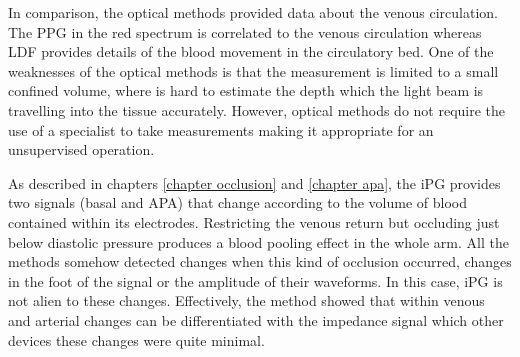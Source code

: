 In comparison, the optical methods provided data about the venous circulation. The PPG in the red spectrum is correlated to the venous circulation whereas LDF provides details of the blood movement in the circulatory bed. One of the weaknesses of the optical methods is that the measurement is limited to a small confined volume, where is hard to estimate the depth which the light beam is travelling into the tissue accurately. However, optical methods do not require the use of a specialist to take measurements making it appropriate for an unsupervised operation.

As described in chapters \ref{chapter occlusion} and \ref{chapter apa}, the iPG provides two signals (basal and APA) that change according to the volume of blood contained within its electrodes. Restricting the venous return but occluding just below diastolic pressure produces a blood pooling effect in the whole arm. All the methods somehow detected changes when this kind of occlusion occurred, changes in the foot of the signal or the amplitude of their waveforms. In this case, iPG is not alien to these changes. Effectively, the method showed that within venous and arterial changes can be differentiated with the impedance signal which other devices these changes were quite minimal. 


